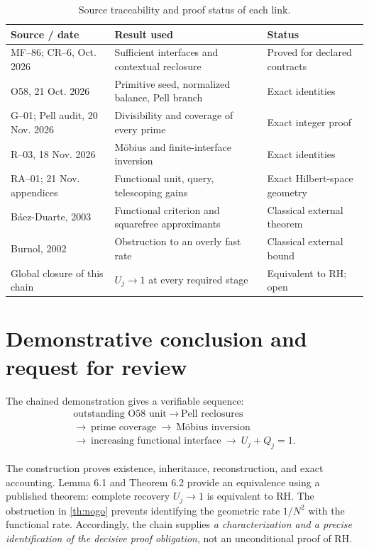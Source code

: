 \documentclass[11pt,a4paper]{article}
\theoremstyle{mine}
\theoremstyle{definition}
\begin{document}
\begin{table}[ht]
\centering\footnotesize
\caption{Source traceability and proof status of each link.}
\renewcommand{\arraystretch}{1.15}
\begin{tabularx}{\linewidth}{@{}p{.21\linewidth}X p{.22\linewidth}@{}}\toprule
Source / date&Result used&Status\\\midrule
MF--86; CR--6, Oct. 2026&Sufficient interfaces and contextual reclosure&Proved for declared contracts\\
O58, 21 Oct. 2026&Primitive seed, normalized balance, Pell branch&Exact identities\\
G--01; Pell audit, 20 Nov. 2026&Divisibility and coverage of every prime&Exact integer proof\\
R--03, 18 Nov. 2026&M\"obius and finite-interface inversion&Exact identities\\
RA--01; 21 Nov. appendices&Functional unit, query, telescoping gains&Exact Hilbert-space geometry\\
B\'aez-Duarte, 2003&Functional criterion and squarefree approximants&Classical external theorem\\
Burnol, 2002&Obstruction to an overly fast rate&Classical external bound\\
Global closure of this chain&$U_j\to1$ at every required stage&Equivalent to RH; open\\\bottomrule
\end{tabularx}
\end{table}

\section{Demonstrative conclusion and request for review}

The chained demonstration gives a verifiable sequence:
\[
\boxed{\begin{gathered}
\text{outstanding O58 unit}\ \longrightarrow\ \text{Pell reclosures}\\
\longrightarrow\ \text{prime coverage}\ \longrightarrow\ \text{M\"obius inversion}\\
\longrightarrow\ \text{increasing functional interface}\ \longrightarrow\ U_j+Q_j=1.
\end{gathered}}
\]

The construction proves existence, inheritance, reconstruction, and exact accounting. Lemma 6.1 and Theorem 6.2 provide an equivalence using a published theorem: complete recovery $U_j\to1$ is equivalent to RH. The obstruction in \cref{th:nogo} prevents identifying the geometric rate $1/N^2$ with the functional rate. Accordingly, the chain supplies \emph{a characterization and a precise identification of the decisive proof obligation}, not an unconditional proof of RH.
\end{document}
